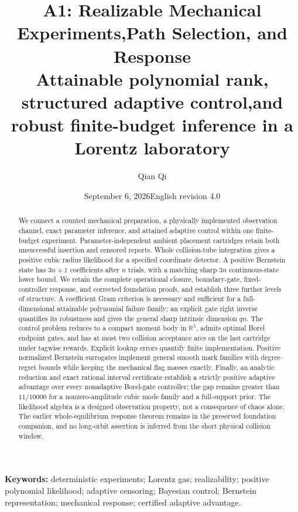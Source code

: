 \documentclass[11pt,a4paper]{article}
\title{\textbf{A1: Realizable Mechanical Experiments,\newline Path Selection, and Response}\\[.6em]
\large Attainable polynomial rank, structured adaptive control,\newline and robust finite-budget inference in a Lorentz laboratory}
\author{Qian Qi}
\date{September 6, 2026\quad English revision 4.0}
\theoremstyle{definition}
\theoremstyle{remark}\newtheorem{remark}[theorem]{Remark}
\begin{document}
\maketitle
\begin{abstract}
We connect a counted mechanical preparation, a physically implemented
observation channel, exact parameter inference, and attained adaptive control
within one finite-budget experiment. Parameter-independent ambient placement
cartridges retain both unsuccessful insertion and censored reports. Whole
collision-tube integration gives a positive cubic radius likelihood for a
specified coordinate detector. A positive Bernstein state has $3n+1$
coefficients after $n$ trials, with a matching sharp $3n$ continuous-state
lower bound. We retain the complete operational closure, boundary-gate,
fixed-controller response, and corrected foundation proofs, and establish
three further levels of structure. A coefficient Gram criterion is necessary
and sufficient for a full-dimensional attainable polynomial failure family;
an explicit gate right inverse quantifies its robustness and gives the
general sharp intrinsic dimension $qn$. The control problem reduces to a
compact moment body in $\mathbb R^5$, admits optimal Borel endpoint gates,
and has at most two collision acceptance arcs on the last cartridge under
tagwise rewards. Explicit lookup errors quantify finite implementation.
Positive normalized Bernstein surrogates implement general smooth mark
families with degree--regret bounds while keeping the mechanical flag masses
exactly. Finally, an analytic reduction and exact rational interval
certificate establish a strictly positive adaptive advantage over every
nonadaptive Borel-gate controller; the gap remains greater than $11/10000$
for a nonzero-amplitude cubic mode family and a full-support prior. The
likelihood algebra is a designed observation property, not a consequence of
chaos alone. The earlier whole-equilibrium response theorem remains in the
preserved foundation companion, and no long-orbit assertion is inferred
from the short physical collision window.
\end{abstract}
\noindent\textbf{Keywords:} deterministic experiments; Lorentz gas; realizability;
positive polynomial likelihood; adaptive censoring; Bayesian control;
Bernstein representation; mechanical response; certified adaptive advantage.
\clearpage
\begingroup\small
\renewcommand{\baselinestretch}{0.93}\selectfont
\tableofcontents
\endgroup
\newpage











\appendix



\end{document}
